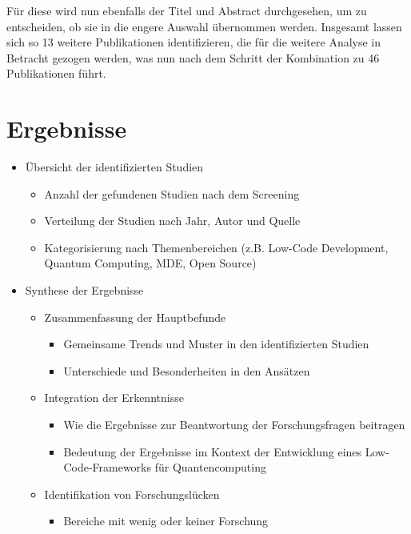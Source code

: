 Für diese wird nun ebenfalls der Titel und Abstract durchgesehen, um zu entscheiden, ob sie in die engere Auswahl übernommen werden. 
Insgesamt lassen sich so 13 weitere Publikationen identifizieren, die für die weitere Analyse in Betracht gezogen werden, was nun nach 
dem Schritt der Kombination zu 46 Publikationen führt. 

\section{Ergebnisse}
\begin{itemize}
    \item Übersicht der identifizierten Studien
        \begin{itemize}
            \item Anzahl der gefundenen Studien nach dem Screening
            \item Verteilung der Studien nach Jahr, Autor und Quelle
            \item Kategorisierung nach Themenbereichen (z.B. Low-Code Development, Quantum Computing, MDE, Open Source)
        \end{itemize}
    \item Synthese der Ergebnisse
        \begin{itemize}
            \item Zusammenfassung der Hauptbefunde
                \begin{itemize}
                    \item Gemeinsame Trends und Muster in den identifizierten Studien
                    \item Unterschiede und Besonderheiten in den Ansätzen
                \end{itemize}
            \item Integration der Erkenntnisse
                \begin{itemize}
                    \item Wie die Ergebnisse zur Beantwortung der Forschungsfragen beitragen
                    \item Bedeutung der Ergebnisse im Kontext der Entwicklung eines Low-Code-Frameworks für Quantencomputing
                \end{itemize}
            \item Identifikation von Forschungslücken
                \begin{itemize}
                    \item Bereiche mit wenig oder keiner Forschung

\end{itemize}
\end{itemize}
\end{itemize}

